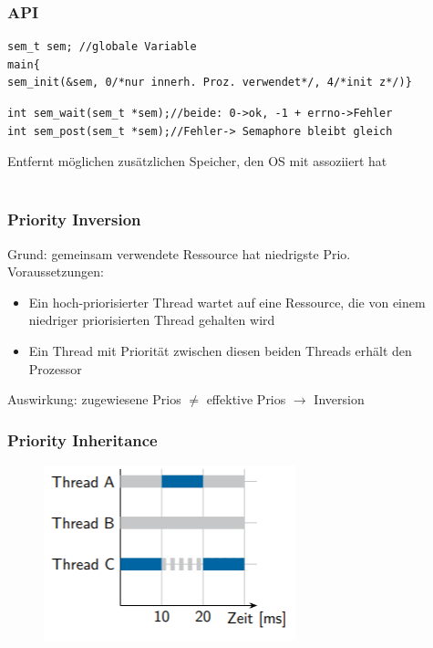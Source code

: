 \subsubsection{API}
\begin{verbatim}
sem_t sem; //globale Variable
main{
sem_init(&sem, 0/*nur innerh. Proz. verwendet*/, 4/*init z*/)}
\end{verbatim}
\begin{verbatim}
int sem_wait(sem_t *sem);//beide: 0->ok, -1 + errno->Fehler
int sem_post(sem_t *sem);//Fehler-> Semaphore bleibt gleich
\end{verbatim}
Entfernt möglichen zusätzlichen Speicher, den OS mit  assoziiert hat\\
\\

\subsubsection{Priority Inversion}
Grund: gemeinsam verwendete Ressource hat niedrigste Prio.\\
Voraussetzungen: 
\begin{itemize}
    \item Ein hoch-priorisierter Thread wartet auf eine Ressource, die von einem niedriger priorisierten Thread gehalten wird
\item Ein Thread mit Priorität zwischen diesen beiden Threads erhält den Prozessor
\end{itemize}
Auswirkung: zugewiesene Prios $\neq$ effektive Prios $\rightarrow$ Inversion

\subsubsection{Priority Inheritance}
\begin{figure}
\includegraphics[scale = 0.3]{grafiken/priority_inheritance.PNG} 
\end{figure}
   
